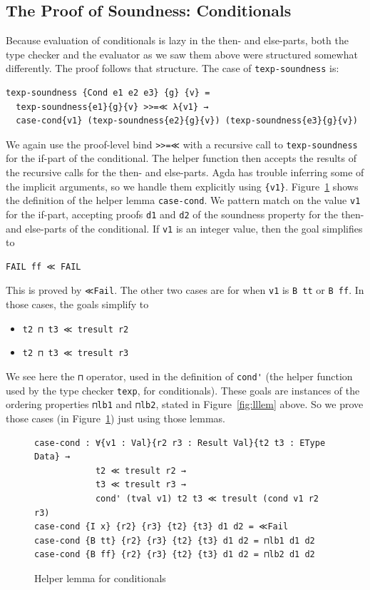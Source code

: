 \documentclass[acmsmall,screen,review]{acmart}
\begin{document}
\subsection{The Proof of Soundness: Conditionals}

Because evaluation of conditionals is lazy in the then- and else-parts, both the type checker and the evaluator
as we saw them above were structured somewhat differently.  The proof follows that structure.  The case
of \verb|texp-soundness| is:
\begin{verbatim}
texp-soundness {Cond e1 e2 e3} {g} {v} = 
  texp-soundness{e1}{g}{v} >>=≪ λ{v1} → 
  case-cond{v1} (texp-soundness{e2}{g}{v}) (texp-soundness{e3}{g}{v})
\end{verbatim}
\noindent We again use the proof-level bind \verb|>>=≪| with a
recursive call to \verb|texp-soundness| for the if-part of the
conditional.  The helper function then accepts the results of the
recursive calls for the then- and else-parts.  Agda has trouble
inferring some of the implicit arguments, so we handle them explicitly
using \verb|{v1}|.  Figure~\ref{fig:casecond} shows the definition of
the helper lemma \verb|case-cond|.  We pattern match on the value
\verb|v1| for the if-part, accepting proofs \verb|d1| and \verb|d2| of
the soundness property for the then- and else-parts of the
conditional.  If \verb|v1| is an integer value, then the goal
simplifies to 
\begin{verbatim}
FAIL ff ≪ FAIL
\end{verbatim}
\noindent This is proved by \verb|≪Fail|.  The other two cases are
for when \verb|v1| is \verb|B tt| or \verb|B ff|.  In those cases,
the goals simplify to
\begin{itemize}
\item \verb|t2 ⊓ t3 ≪ tresult r2|
\item \verb|t2 ⊓ t3 ≪ tresult r3|
\end{itemize}
\noindent We see here the \verb|⊓| operator, used in the definition of \verb|cond'| (the helper function used by 
the type checker \verb|texp|, for conditionals).  These goals are instances of the ordering properties \verb|⊓lb1|
and \verb|⊓lb2|, stated in Figure~\ref{fig:lllem} above.  So we prove those cases (in Figure~\ref{fig:casecond}) just using those lemmas.

\begin{figure}
\begin{verbatim}
case-cond : ∀{v1 : Val}{r2 r3 : Result Val}{t2 t3 : EType Data} →
            t2 ≪ tresult r2 →
            t3 ≪ tresult r3 →             
            cond' (tval v1) t2 t3 ≪ tresult (cond v1 r2 r3)
case-cond {I x} {r2} {r3} {t2} {t3} d1 d2 = ≪Fail
case-cond {B tt} {r2} {r3} {t2} {t3} d1 d2 = ⊓lb1 d1 d2
case-cond {B ff} {r2} {r3} {t2} {t3} d1 d2 = ⊓lb2 d1 d2
\end{verbatim}
\caption{Helper lemma for conditionals}
\label{fig:casecond}
\end{figure}
\end{document}
